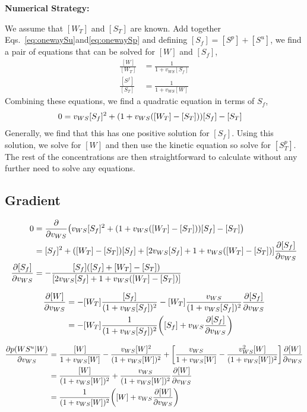 \documentclass[aps,onecolumn,superscriptaddress,notitlepage]{revtex4-1}
\begin{document}
\textbf{Numerical Strategy:}

We assume that  $[W_T]$ and $[S_T]$ are known. 
Add together Eqs.~\eqref{eq:onewaySu}and\eqref{eq:onewaySp} and defining $[S_f] = [S^p]+[S^u]$, 
we find a pair of equations that can be solved for $[W]$ and $[S_f]$,
\begin{align}
\frac{[W]}{[W_T]} & = \frac{1}{1 + v_{WS}[S_f]}\\
\frac{[S^f]}{[S_T]} &= \frac{1}{1 + v_{WS}[W]}
\end{align}
Combining these equations, we find a quadratic equation in terms of $S_f$,
\begin{align}
0 &= v_{WS}[S_f]^2 +  \qty(1+v_{WS}([W_T]-[S_T]))[S_f] - [S_T]
\end{align}
Generally, we find that this has one positive solution for $[S_f]$. 
Using this solution, we solve for $[W]$ and then use the kinetic equation so solve for $[S_T^p]$. The rest of the concentrations are then straightforward to calculate without any further need to solve any equations.


\subsection{Gradient}

\begin{align}
0 &= \pdv{}{v_{WS}}\qty(v_{WS}[S_f]^2 +  \qty(1+v_{WS}([W_T]-[S_T]))[S_f] - [S_T])\\
&= [S_f]^2 +   ([W_T]-[S_T])[S_f] + \qty[2v_{WS}[S_f] +   1+v_{WS}([W_T]-[S_T])]\pdv{[S_f]}{v_{WS}}\\
\pdv{[S_f]}{v_{WS}} &= -\frac{[S_f]\qty([S_f] +   [W_T]-[S_T])}{ \qty[2v_{WS}[S_f] +   1+v_{WS}([W_T]-[S_T])]}
\end{align}

\begin{align}
\pdv{[W]}{v_{WS}} &= -[W_T]\frac{[S_f]}{(1+v_{WS}[S_f])^2}-[W_T]\frac{v_{WS}}{(1+v_{WS}[S_f])^2}\pdv{[S_f]}{v_{WS}}\\
&= -[W_T]\frac{1}{(1+v_{WS}[S_f])^2}\qty([S_f] + v_{WS}\pdv{[S_f]}{v_{WS}})
\end{align}

\begin{align}
\pdv{p(WS^u|W)}{v_{WS}} &= \frac{[W]}{1+v_{WS}[W]} - \frac{v_{WS}[W]^2}{(1+v_{WS}[W])^2} + \qty[\frac{v_{WS}}{1+v_{WS}[W]} - \frac{v_{WS}^2[W]}{(1+v_{WS}[W])^2}]\pdv{[W]}{v_{WS}}\\
&= \frac{[W]}{(1+v_{WS}[W])^2} + \frac{v_{WS}}{(1+v_{WS}[W])^2}\pdv{[W]}{v_{WS}}\\
&= \frac{1}{(1+v_{WS}[W])^2}\qty([W] + v_{WS}\pdv{[W]}{v_{WS}})
\end{align}
\end{document}
